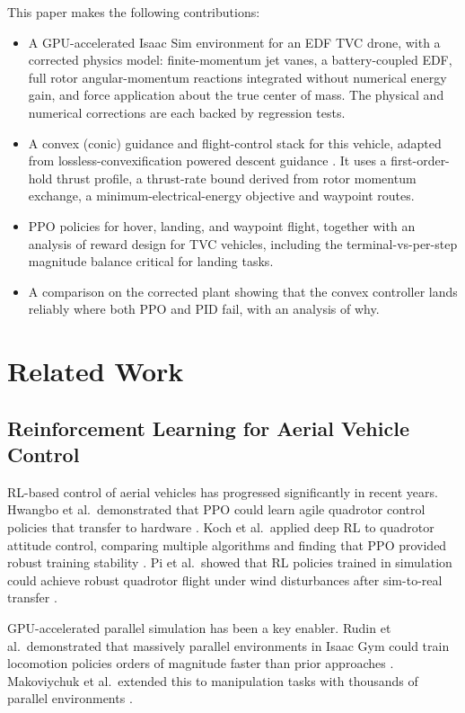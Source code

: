 \documentclass[conference]{IEEEtran}
\begin{document}
This paper makes the following contributions:
\begin{itemize}
    \item A GPU-accelerated Isaac Sim environment for an EDF TVC drone, with a corrected physics model: finite-momentum jet vanes, a battery-coupled EDF, full rotor angular-momentum reactions integrated without numerical energy gain, and force application about the true center of mass. The physical and numerical corrections are each backed by regression tests.
    \item A convex (conic) guidance and flight-control stack for this vehicle, adapted from lossless-convexification powered descent guidance \cite{b21}. It uses a first-order-hold thrust profile, a thrust-rate bound derived from rotor momentum exchange, a minimum-electrical-energy objective and waypoint routes.
    \item PPO policies for hover, landing, and waypoint flight, together with an analysis of reward design for TVC vehicles, including the terminal-vs-per-step magnitude balance critical for landing tasks.
    \item A comparison on the corrected plant showing that the convex controller lands reliably where both PPO and PID fail, with an analysis of why.
\end{itemize}


\section{Related Work}

\subsection{Reinforcement Learning for Aerial Vehicle Control}

RL-based control of aerial vehicles has progressed significantly in recent years. Hwangbo et al.\ demonstrated that PPO could learn agile quadrotor control policies that transfer to hardware \cite{b2}. Koch et al.\ applied deep RL to quadrotor attitude control, comparing multiple algorithms and finding that PPO provided robust training stability \cite{b3}. Pi et al.\ showed that RL policies trained in simulation could achieve robust quadrotor flight under wind disturbances after sim-to-real transfer \cite{b4}.

GPU-accelerated parallel simulation has been a key enabler. Rudin et al.\ demonstrated that massively parallel environments in Isaac Gym could train locomotion policies orders of magnitude faster than prior approaches \cite{b6}. Makoviychuk et al.\ extended this to manipulation tasks with thousands of parallel environments \cite{b7}.
\end{document}
